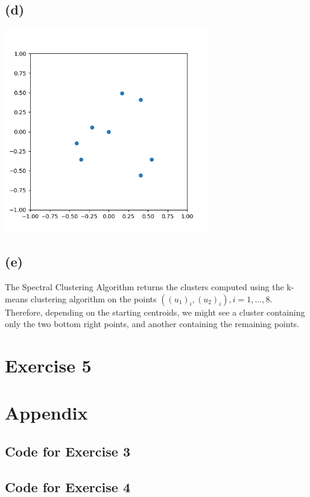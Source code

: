 \documentclass[12pt]{article}
\begin{document}
\subsection*{(d)}
\begin{center}
	\includegraphics[width=3.5in]{code/exercise_04_d.png}
\end{center}

\subsection*{(e)}
The Spectral Clustering Algorithm returns the clusters computed using the k-means clustering algorithm on the points $\left( (u_1)_i, (u_2)_i \right), i = 1, \dots, 8$. Therefore, depending on the starting centroids, we might see a cluster containing only the two bottom right points, and another containing the remaining points.

\section*{Exercise 5}


\section*{Appendix}\label{appendix}
\subsection*{Code for Exercise 3}

\subsection*{Code for Exercise 4}

\end{document}
